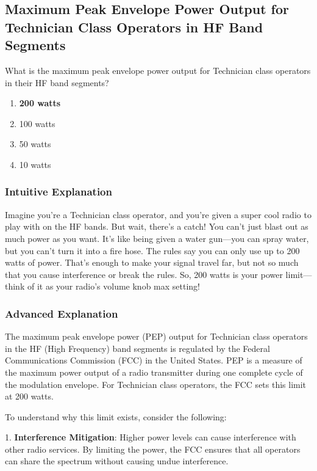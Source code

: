 \subsection{Maximum Peak Envelope Power Output for Technician Class Operators in HF Band Segments}
\label{T1B11}

\begin{tcolorbox}[colback=gray!10!white,colframe=black!75!black,title=T1B11]
What is the maximum peak envelope power output for Technician class operators in their HF band segments?
\begin{enumerate}[label=\Alph*)]
    \item \textbf{200 watts}
    \item 100 watts
    \item 50 watts
    \item 10 watts
\end{enumerate}
\end{tcolorbox}

\subsubsection{Intuitive Explanation}
Imagine you're a Technician class operator, and you're given a super cool radio to play with on the HF bands. But wait, there's a catch! You can't just blast out as much power as you want. It's like being given a water gun—you can spray water, but you can't turn it into a fire hose. The rules say you can only use up to 200 watts of power. That's enough to make your signal travel far, but not so much that you cause interference or break the rules. So, 200 watts is your power limit—think of it as your radio's volume knob max setting!

\subsubsection{Advanced Explanation}
The maximum peak envelope power (PEP) output for Technician class operators in the HF (High Frequency) band segments is regulated by the Federal Communications Commission (FCC) in the United States. PEP is a measure of the maximum power output of a radio transmitter during one complete cycle of the modulation envelope. For Technician class operators, the FCC sets this limit at 200 watts.

To understand why this limit exists, consider the following:

1. \textbf{Interference Mitigation}: Higher power levels can cause interference with other radio services. By limiting the power, the FCC ensures that all operators can share the spectrum without causing undue interference.

